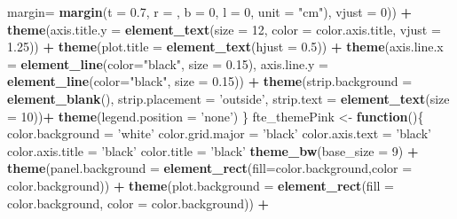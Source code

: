 \documentclass[]{article}
\newenvironment{Shaded}{\begin{snugshade}}{\end{snugshade}}
\newcommand{\KeywordTok}[1]{\textcolor[rgb]{0.13,0.29,0.53}{\textbf{#1}}}
\newcommand{\DataTypeTok}[1]{\textcolor[rgb]{0.13,0.29,0.53}{#1}}
\newcommand{\DecValTok}[1]{\textcolor[rgb]{0.00,0.00,0.81}{#1}}
\newcommand{\FloatTok}[1]{\textcolor[rgb]{0.00,0.00,0.81}{#1}}
\newcommand{\StringTok}[1]{\textcolor[rgb]{0.31,0.60,0.02}{#1}}
\newcommand{\ControlFlowTok}[1]{\textcolor[rgb]{0.13,0.29,0.53}{\textbf{#1}}}
\newcommand{\OperatorTok}[1]{\textcolor[rgb]{0.81,0.36,0.00}{\textbf{#1}}}
\newcommand{\NormalTok}[1]{#1}
\begin{document}
\begin{Shaded}
\begin{Highlighting}[]
                                      \DataTypeTok{margin=} \KeywordTok{margin}\NormalTok{(}\DataTypeTok{t =} \FloatTok{0.7}\NormalTok{, }\DataTypeTok{r =}\NormalTok{ , }\DataTypeTok{b =} \DecValTok{0}\NormalTok{, }\DataTypeTok{l =} \DecValTok{0}\NormalTok{, }\DataTypeTok{unit =} \StringTok{"cm"}\NormalTok{), }\DataTypeTok{vjust =} \DecValTok{0}\NormalTok{)) }\OperatorTok{+}
\StringTok{    }\KeywordTok{theme}\NormalTok{(}\DataTypeTok{axis.title.y =} \KeywordTok{element_text}\NormalTok{(}\DataTypeTok{size =} \DecValTok{12}\NormalTok{, }\DataTypeTok{color =}\NormalTok{ color.axis.title, }\DataTypeTok{vjust =} \FloatTok{1.25}\NormalTok{)) }\OperatorTok{+}
\StringTok{    }\KeywordTok{theme}\NormalTok{(}\DataTypeTok{plot.title =} \KeywordTok{element_text}\NormalTok{(}\DataTypeTok{hjust =} \FloatTok{0.5}\NormalTok{)) }\OperatorTok{+}
\StringTok{    }\KeywordTok{theme}\NormalTok{(}\DataTypeTok{axis.line.x =} \KeywordTok{element_line}\NormalTok{(}\DataTypeTok{color=}\StringTok{"black"}\NormalTok{, }\DataTypeTok{size =} \FloatTok{0.15}\NormalTok{),}
          \DataTypeTok{axis.line.y =} \KeywordTok{element_line}\NormalTok{(}\DataTypeTok{color=}\StringTok{"black"}\NormalTok{, }\DataTypeTok{size =} \FloatTok{0.15}\NormalTok{)) }\OperatorTok{+}
\StringTok{    }\KeywordTok{theme}\NormalTok{(}\DataTypeTok{strip.background =} \KeywordTok{element_blank}\NormalTok{(),}
          \DataTypeTok{strip.placement =} \StringTok{'outside'}\NormalTok{,}
          \DataTypeTok{strip.text =} \KeywordTok{element_text}\NormalTok{(}\DataTypeTok{size =} \DecValTok{10}\NormalTok{))}\OperatorTok{+}
\StringTok{    }\KeywordTok{theme}\NormalTok{(}\DataTypeTok{legend.position =} \StringTok{'none'}\NormalTok{)}
\NormalTok{\} }
\NormalTok{fte_themePink <-}\StringTok{ }\ControlFlowTok{function}\NormalTok{()\{}
\NormalTok{  color.background =}\StringTok{ 'white'}
\NormalTok{  color.grid.major =}\StringTok{ 'black'}
\NormalTok{  color.axis.text =}\StringTok{ 'black'}
\NormalTok{  color.axis.title =}\StringTok{ 'black'}
\NormalTok{  color.title =}\StringTok{ 'black'}
  \KeywordTok{theme_bw}\NormalTok{(}\DataTypeTok{base_size =} \DecValTok{9}\NormalTok{) }\OperatorTok{+}\StringTok{ }
\StringTok{    }\KeywordTok{theme}\NormalTok{(}\DataTypeTok{panel.background =} \KeywordTok{element_rect}\NormalTok{(}\DataTypeTok{fill=}\NormalTok{color.background,}\DataTypeTok{color =}\NormalTok{ color.background)) }\OperatorTok{+}
\StringTok{    }\KeywordTok{theme}\NormalTok{(}\DataTypeTok{plot.background =} \KeywordTok{element_rect}\NormalTok{(}\DataTypeTok{fill =}\NormalTok{ color.background, }\DataTypeTok{color =}\NormalTok{ color.background)) }\OperatorTok{+}

\end{Highlighting}
\end{Shaded}
\end{document}
